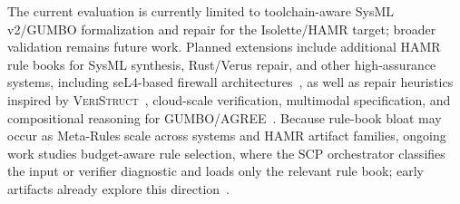 \documentclass[conference]{IEEEtran}
\begin{document}
The current evaluation is currently limited to toolchain-aware SysML v2/GUMBO formalization and repair for the Isolette/HAMR target; broader validation remains future work. Planned extensions include additional HAMR rule books for SysML synthesis, Rust/Verus repair, and other high-assurance systems, including seL4-based firewall architectures~\cite{Hatcliff:seL4Summit2025}, as well as repair heuristics inspired by \textsc{VeriStruct}~\cite{sun2025veristruct}, cloud-scale verification, multimodal specification, and compositional reasoning for GUMBO/AGREE~\cite{compositional-analysis-agree,agreedog_tahat2025}. Because rule-book bloat may occur as Meta-Rules scale across systems and HAMR artifact families, ongoing work studies budget-aware rule selection, where the SCP orchestrator classifies the input or verifier diagnostic and loads only the relevant rule book; early artifacts already explore this direction~\cite{inspecta_repo}.
\end{document}
